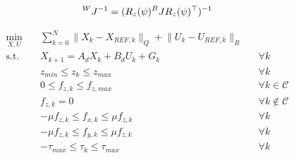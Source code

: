 \documentclass{article}
\begin{document}
\begin{equation}
{}^WJ^{-1} = (R_z(\psi){}^BJR_z(\psi)^\top)^{-1} \\
\end{equation}

\begin{align}
\min_{X,U} \quad & \sum^{N}_{k=0} \lVert X_k - X_{REF, k} \lVert_Q + \lVert U_k - U_{REF,  k} \lVert_R \\
\textrm{s.t.} \quad & X_{k+1} = A_d X_k + B_d U_k + G_k  && \forall k  \\
  & z_{min} \leq {z_k} \leq z_{max} && \forall k  \\ 
  & 0 \leq {f_{z, k}} \leq f_{z, max} && \forall k \in \mathcal{C}  \\
  & f_{z, k} = 0 && \forall k \notin \mathcal{C}  \\
  & -\mu {f_{z, k}} \leq f_{x, k} \leq \mu {f_{z, k}} && \forall k  \\
  & -\mu {f_{z, k}} \leq f_{y, k} \leq \mu {f_{z, k}} && \forall k  \\   
  & -\tau_{max} \leq {\tau_k} \leq \tau_{max} && \forall k 
\end{align}
\end{document}
